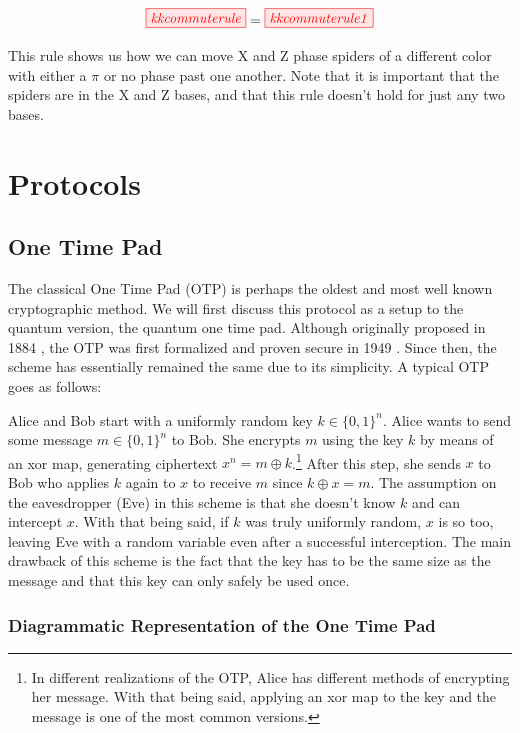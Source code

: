 \documentclass[]{article}
\begin{document}
\begin{equation}
\label{equation:kkcommuterule}
\tikzfig{kkcommuterule} = \tikzfig{kkcommuterule1}
\end{equation}

This rule shows us how we can move X and Z phase spiders of a different color with either a $\pi$ or no phase past one another. Note that it is important that the spiders are in the X and Z bases, and that this rule doesn't hold for just any two bases.

\section{Protocols}
\label{section:protocols}

\subsection{One Time Pad}

The classical One Time Pad (OTP) is perhaps the oldest and most well known cryptographic method. We will first discuss this protocol as a setup to the quantum version, the quantum one time pad. Although originally proposed in 1884 \cite{Markoff2011}, the OTP was first formalized and proven secure in 1949 \cite{Shannon1949}. Since then, the scheme has essentially remained the same due to its simplicity. A typical OTP goes as follows:

Alice and Bob start with a uniformly random key $k \in \{0,1\}^n$. Alice wants to send some message $m \in \{0,1\}^n$ to Bob. She encrypts $m$ using the key $k$ by means of an xor map, generating ciphertext $x^n = m \oplus k$.\footnote{In different realizations of the OTP, Alice has different methods of encrypting her message. With that being said, applying an xor map to the key and the message is one of the most common versions.} After this step, she sends $x$ to Bob who applies $k$ again to $x$ to receive $m$ since $k \oplus x = m$. The assumption on the eavesdropper (Eve) in this scheme is that she doesn't know $k$ and can intercept $x$. With that being said, if $k$ was truly uniformly random, $x$ is so too, leaving Eve with a random variable even after a successful interception. The main drawback of this scheme is the fact that the key has to be the same size as the message and that this key can only safely be used once.

\subsubsection{Diagrammatic Representation of the One Time Pad}
\end{document}
